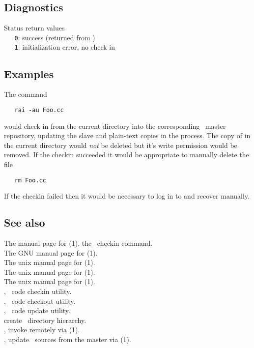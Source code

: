 \subsection*{Diagnostics}
 
Status return values
\\ \verb+   0+:  success (returned from )
\\ \verb+   1+:  initialization error, no check in\\
 
\subsection*{Examples}
 
The command
 
\begin{verbatim}
   rai -au Foo.cc
\end{verbatim}
 
\noindent
would check in  from the current directory into the corresponding
\aipspp\ master repository, updating the slave and plain-text copies in the
process.  The copy of  in the current directory would \emph{not}
be deleted but it's write permission would be removed.  If the checkin
succeeded it would be appropriate to manually delete the file

\begin{verbatim}
   rm Foo.cc
\end{verbatim}
 
\noindent
If the checkin failed then it would be necessary to log in to
 and recover manually.

\subsection*{See also}

The manual page for (1), the \rcs\ checkin command.\\
The GNU manual page for (1).\\
The unix manual page for (1).\\
The unix manual page for (1).\\
The unix manual page for (1).\\
, \aipspp\ code checkin utility.\\
, \aipspp\ code checkout utility.\\
, \aipspp\ code update utility.\\
 create \aipspp\ directory hierarchy.\\
, invoke  remotely via (1).\\
, update \aipspp\ sources from the master via (1).
 
